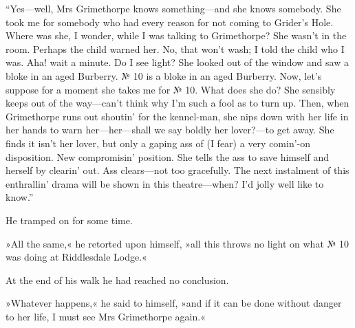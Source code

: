 \enquote{Yes\allowbreak---\allowbreak well, Mrs Grimethorpe knows something\allowbreak---\allowbreak and she knows somebody.  She took me for somebody who had every reason for not coming to Grider's Hole. Where was she, I wonder, while I was talking to Grimethorpe? She wasn't in the room. Perhaps the child warned her. No, that won't wash; I told the child who I was. Aha! wait a minute. Do I see light? She looked out of the window and saw a bloke in an aged Burberry. № 10 is a bloke in an aged Burberry. Now, let's suppose for a moment she takes me for № 10. What does she do? She sensibly keeps out of the way\allowbreak---\allowbreak can't think why I'm such a fool as to turn up.  Then, when Grimethorpe runs out shoutin' for the kennel-man, she nips down with her life in her hands to warn her\allowbreak---\allowbreak her---shall we say boldly her lover?---to get away. She finds it isn't her lover, but only a gaping ass of (I fear) a very comin'-on disposition. New compromisin' position. She tells the ass to save himself and herself by clearin' out. Ass clears\allowbreak---\allowbreak not too gracefully. The next instalment of this enthrallin' drama will be shown in this theatre\allowbreak---\allowbreak when? I'd jolly well like to know.}

He tramped on for some time.

»All the same,« he retorted upon himself, »all this throws no light on what № 10 was doing at Riddlesdale Lodge.«

At the end of his walk he had reached no conclusion.

»Whatever happens,« he said to himself, »and if it can be done without danger to her life, I must see Mrs Grimethorpe again.«



